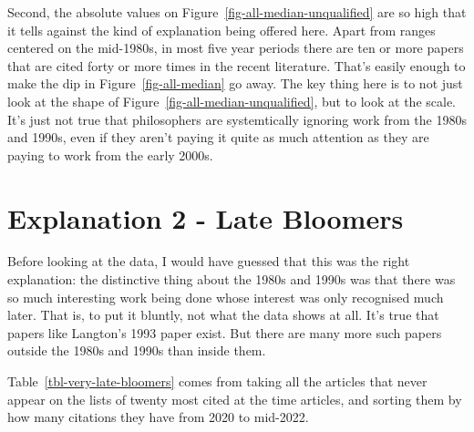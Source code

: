 \documentclass[
  10pt,
  letterpaper,
  DIV=11,
  numbers=noendperiod,
  twoside]{scrartcl}
\begin{document}
Second, the absolute values on Figure~\ref{fig-all-median-unqualified}
are so high that it tells against the kind of explanation being offered
here. Apart from ranges centered on the mid-1980s, in most five year
periods there are ten or more papers that are cited forty or more times
in the recent literature. That's easily enough to make the dip in
Figure~\ref{fig-all-median} go away. The key thing here is to not just
look at the shape of Figure~\ref{fig-all-median-unqualified}, but to
look at the scale. It's just not true that philosophers are
systemtically ignoring work from the 1980s and 1990s, even if they
aren't paying it quite as much attention as they are paying to work from
the early 2000s.

\section{Explanation 2 - Late Bloomers}\label{sec-late-bloomers}

Before looking at the data, I would have guessed that this was the right
explanation: the distinctive thing about the 1980s and 1990s was that
there was so much interesting work being done whose interest was only
recognised much later. That is, to put it bluntly, not what the data
shows at all. It's true that papers like Langton's 1993 paper exist. But
there are many more such papers outside the 1980s and 1990s than inside
them.

Table~\ref{tbl-very-late-bloomers} comes from taking all the articles
that never appear on the lists of twenty most cited at the time
articles, and sorting them by how many citations they have from 2020 to
mid-2022.
\end{document}

